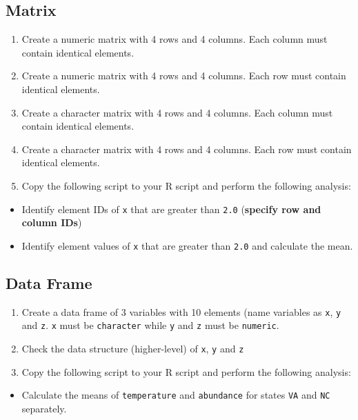 \documentclass[
]{book}
\providecommand{\tightlist}{%
  \setlength{\itemsep}{0pt}\setlength{\parskip}{0pt}}
\begin{document}
\hypertarget{matrix-1}{%
\subsection{Matrix}\label{matrix-1}}

\begin{enumerate}
\def\labelenumi{\alph{enumi}.}
\tightlist
\item
  Create a numeric matrix with 4 rows and 4 columns. Each column must contain identical elements.
\item
  Create a numeric matrix with 4 rows and 4 columns. Each row must contain identical elements.
\item
  Create a character matrix with 4 rows and 4 columns. Each column must contain identical elements.
\item
  Create a character matrix with 4 rows and 4 columns. Each row must contain identical elements.
\item
  Copy the following script to your R script and perform the following analysis:
\end{enumerate}

\begin{itemize}
\tightlist
\item
  Identify element IDs of \texttt{x} that are greater than \texttt{2.0} (\textbf{specify row and column IDs})
\item
  Identify element values of \texttt{x} that are greater than \texttt{2.0} and calculate the mean.
\end{itemize}

\hypertarget{data-frame-1}{%
\subsection{Data Frame}\label{data-frame-1}}

\begin{enumerate}
\def\labelenumi{\alph{enumi}.}
\tightlist
\item
  Create a data frame of 3 variables with 10 elements (name variables as \texttt{x}, \texttt{y} and \texttt{z}. \texttt{x} must be \texttt{character} while \texttt{y} and \texttt{z} must be \texttt{numeric}.
\item
  Check the data structure (higher-level) of \texttt{x}, \texttt{y} and \texttt{z}
\item
  Copy the following script to your R script and perform the following analysis:
\end{enumerate}

\begin{itemize}
\tightlist
\item
  Calculate the means of \texttt{temperature} and \texttt{abundance} for states \texttt{VA} and \texttt{NC} separately.
\end{itemize}
\end{document}
